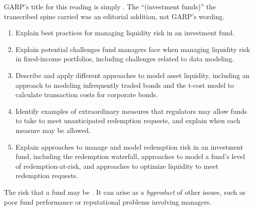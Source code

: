 

\begin{imtrapbox}[breakable=false,title={The title carries no parenthetical}]
GARP's title for this reading is simply . The
``(investment funds)'' the transcribed spine carried was an editorial addition,
not GARP's wording.
\end{imtrapbox}

\begin{imkeybox}[title={The five objectives in this reading}]
\begin{enumerate}[label=\textbf{\alph*.}]
\item Explain best practices for managing liquidity risk in an investment fund.
\item Explain potential challenges fund managers face when managing liquidity risk in fixed-income portfolios, including challenges related to data modeling.
\item Describe and apply different approaches to model asset liquidity, including an approach to modeling infrequently traded bonds and the t-cost model to calculate transaction costs for corporate bonds.
\item Identify examples of extraordinary measures that regulators may allow funds to take to meet unanticipated redemption requests, and explain when each measure may be allowed.
\item Explain approaches to manage and model redemption risk in an investment fund, including the redemption waterfall, approaches to model a fund's level of redemption-at-risk, and approaches to optimize liquidity to meet redemption requests.
\end{enumerate}
\end{imkeybox}


\begin{imdefbox}[title={Fund liquidity risk}]
The risk that a fund may be . It can arise as a \emph{byproduct} of other issues, such as
poor fund performance or reputational problems involving managers.
\end{imdefbox}

